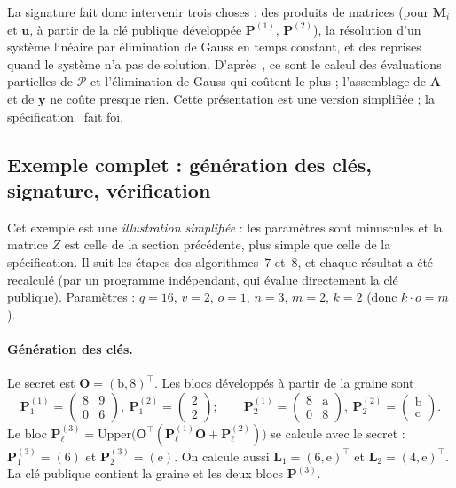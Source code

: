 La signature fait donc intervenir trois choses : des produits de matrices (pour $\mathbf{M}_i$ et $\mathbf{u}$, à partir de la clé publique développée $\mathbf{P}^{(1)}$, $\mathbf{P}^{(2)}$), la résolution d'un système linéaire par élimination de Gauss en temps constant, et des reprises quand le système n'a pas de solution. D'après~\cite{nibbling}, ce sont le calcul des évaluations partielles de $\mathcal{P}$ et l'élimination de Gauss qui coûtent le plus ; l'assemblage de $\mathbf{A}$ et de $\mathbf{y}$ ne coûte presque rien. Cette présentation est une version simplifiée ; la spécification~\cite{mayospec} fait foi.

\subsection{Exemple complet : génération des clés, signature, vérification}\label{sec:jouet}
Cet exemple est une \emph{illustration simplifiée} : les paramètres sont minuscules et la matrice $Z$ est celle de la section précédente, plus simple que celle de la spécification. Il suit les étapes des algorithmes~7 et~8, et chaque résultat a été recalculé (par un programme indépendant, qui évalue directement la clé publique). Paramètres : $q=16$, $v=2$, $o=1$, $n=3$, $m=2$, $k=2$ (donc $k\cdot o=m$).

\paragraph{Génération des clés.} Le secret est $\mathbf{O}=(\mathrm{b},8)^{\top}$. Les blocs développés à partir de la graine sont
\[\mathbf{P}^{(1)}_1=\begin{pmatrix}8&9\\0&6\end{pmatrix},\ \mathbf{P}^{(2)}_1=\begin{pmatrix}2\\2\end{pmatrix};\qquad
\mathbf{P}^{(1)}_2=\begin{pmatrix}8&\mathrm{a}\\0&8\end{pmatrix},\ \mathbf{P}^{(2)}_2=\begin{pmatrix}\mathrm{b}\\\mathrm{c}\end{pmatrix}.\]
Le bloc $\mathbf{P}^{(3)}_\ell=\mathrm{Upper}\bigl(\mathbf{O}^{\top}(\mathbf{P}^{(1)}_\ell\mathbf{O}+\mathbf{P}^{(2)}_\ell)\bigr)$ se calcule avec le secret : $\mathbf{P}^{(3)}_1=(6)$ et $\mathbf{P}^{(3)}_2=(\mathrm{e})$. On calcule aussi $\mathbf{L}_1=(6,\mathrm{e})^{\top}$ et $\mathbf{L}_2=(4,\mathrm{e})^{\top}$. La clé publique contient la graine et les deux blocs $\mathbf{P}^{(3)}$.

